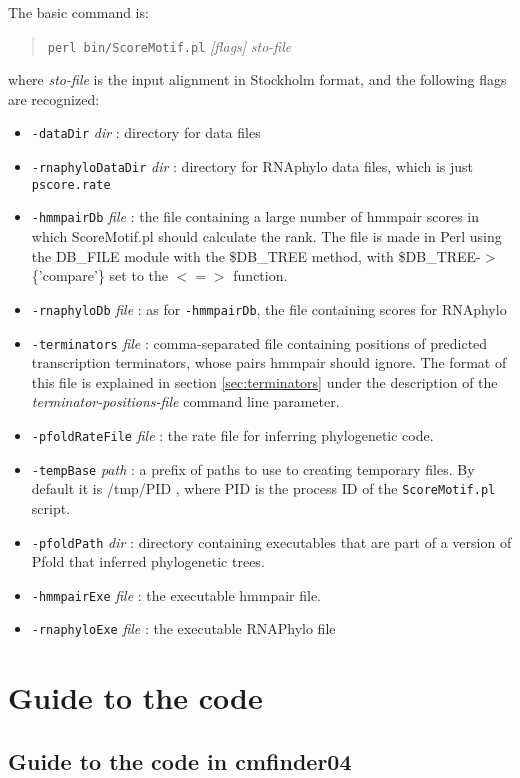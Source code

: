 \documentclass[letterpaper,12pt]{report}
\newcommand{\example}[1]{
\begin{quote}
{\raggedright
#1
}
\end{quote}
}
\begin{document}
The basic command is:
\example{
{\tt perl bin/ScoreMotif.pl} {\it [flags]} {\it sto-file}
}
where {\it sto-file} is the input alignment in Stockholm format, and the following flags are recognized:
\begin{itemize}
\item {\tt -dataDir} {\it dir} : directory for data files
\item {\tt -rnaphyloDataDir} {\it dir} : directory for RNAphylo data files, which is just {\tt pscore.rate}
\item {\tt -hmmpairDb} {\it file} : the file containing a large number of hmmpair scores in which ScoreMotif.pl should calculate the rank.  The file is made in Perl using the DB\_FILE module with the \$DB\_TREE method, with \$DB\_TREE-$>$\{'compare'\} set to the $<=>$ function.
\item {\tt -rnaphyloDb} {\it file} : as for {\tt -hmmpairDb}, the file containing scores for RNAphylo
\item {\tt -terminators} {\it file} : comma-separated file containing positions of predicted transcription terminators, whose pairs hmmpair should ignore.  The format of this file is explained in section \ref{sec:terminators} under the description of the {\it terminator-positions-file} command line parameter.
\item {\tt -pfoldRateFile} {\it file} : the rate file for inferring phylogenetic code.
\item {\tt -tempBase} {\it path} : a prefix of paths to use to creating temporary files. By default it is /tmp/PID , where PID is the process ID of the {\tt ScoreMotif.pl} script.
\item {\tt -pfoldPath} {\it dir} : directory containing executables that are part of a version of Pfold that inferred phylogenetic trees.
\item {\tt -hmmpairExe} {\it file} : the executable hmmpair file.
\item {\tt -rnaphyloExe} {\it file} : the executable RNAPhylo file
\end{itemize}

\chapter{Guide to the code}

\section{Guide to the code in cmfinder04}
\end{document}
